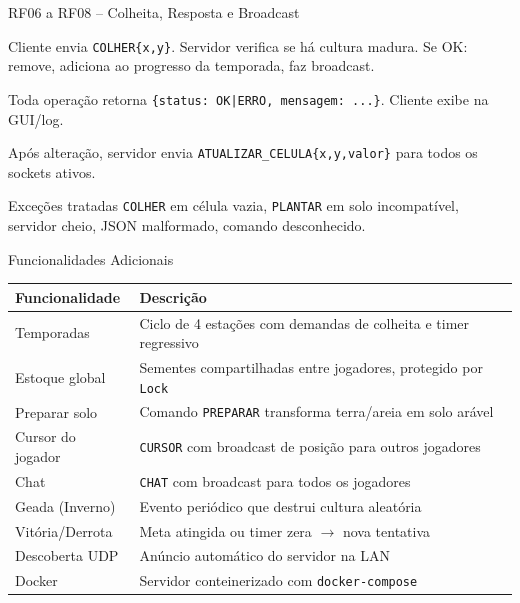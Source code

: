 \documentclass[aspectratio=169]{beamer}
\begin{document}
\begin{frame}{RF06 a RF08 -- Colheita, Resposta e Broadcast}
  \begin{description}[RF07 - Confirma\c{c}\~ao]
    \item[RF06 - COLHER] Cliente envia \texttt{COLHER\{x,y\}}. Servidor verifica se h\'a cultura madura. Se OK: remove, adiciona ao progresso da temporada, faz broadcast.
    \item[RF07 - RESPOSTA] Toda opera\c{c}\~ao retorna \texttt{\{status: OK|ERRO, mensagem: ...\}}. Cliente exibe na GUI/log.
    \item[RF08 - Broadcast] Ap\'os altera\c{c}\~ao, servidor envia \texttt{ATUALIZAR\_CELULA\{x,y,valor\}} para todos os sockets ativos.
  \end{description}
  \vfill
  \begin{alertblock}{Exce\c{c}\~oes tratadas}
    \texttt{COLHER} em c\'elula vazia, \texttt{PLANTAR} em solo incompat\'ivel, servidor cheio, JSON malformado, comando desconhecido.
  \end{alertblock}
\end{frame}

\begin{frame}{Funcionalidades Adicionais}
  \footnotesize
  \begin{tabular}{>{\raggedright\arraybackslash}p{3cm}>{\raggedright\arraybackslash}p{9.5cm}}
    \toprule
    \textbf{Funcionalidade} & \textbf{Descri\c{c}\~ao} \\
    \midrule
    Temporadas & Ciclo de 4 esta\c{c}\~oes com demandas de colheita e timer regressivo \\
    Estoque global & Sementes compartilhadas entre jogadores, protegido por \texttt{Lock} \\
    Preparar solo & Comando \texttt{PREPARAR} transforma terra/areia em solo ar\'avel \\
    Cursor do jogador & \texttt{CURSOR} com broadcast de posi\c{c}\~ao para outros jogadores \\
    Chat & \texttt{CHAT} com broadcast para todos os jogadores \\
    Geada (Inverno) & Evento peri\'odico que destrui cultura aleat\'oria \\
    Vit\'oria/Derrota & Meta atingida ou timer zera $\rightarrow$ nova tentativa \\
    Descoberta UDP & An\'uncio autom\'atico do servidor na LAN \\
    Docker & Servidor conteinerizado com \texttt{docker-compose} \\
    \bottomrule
  \end{tabular}
\end{frame}
\end{document}

